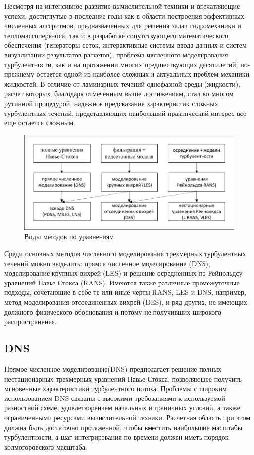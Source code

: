 	Несмотря на интенсивное развитие вычислительной техники и впечатляющие успехи, достигнутые в последние годы как в области построения эффективных численных алгоритмов, предназначенных для решения задач гидромеханики и тепломассопереноса, так и в разработке сопутствующего математического обеспечения (генераторы сеток, интерактивные системы ввода данных и систем визуализации результатов расчетов), проблема численного моделирования турбулентности, как и на протяжении многих предшествующих десятилетий, по-прежнему остается одной из наиболее сложных и актуальных проблем механики жидкостей. В отличие от ламинарных течений однофазной среды (жидкости), расчет которых, благодаря отмеченным выше достижениям, стал во многом рутинной процедурой, надежное предсказание характеристик сложных турбулентных течений, представляющих наибольший практический интерес все еще остается сложным.
	\begin{figure}[H]
		\centering
		\includegraphics[width=0.9\linewidth]{../Assets/СхемаМетодовRU}
		\caption{Виды методов по уравнениям}
		\label{fig:cheme}
	\end{figure}
	
	Среди основных методов численного моделирования трехмерных турбулентных течений можно выделить: прямое численное моделирование (DNS), моделирование крупных вихрей (LES) и решение осредненных по Рейнольдсу уравнений Навье-Стокса (RANS). Имеются также различные промежуточные подходы, сочетающие в себе те или иные черты RANS, LES и DNS, например, метод моделирования отсоединенных вихрей (DES), и ряд других, не имеющих должного физического обоснования и потому не получивших широкого распространения.

\subsection{DNS}
	
	Прямое численное моделирование(DNS) предполагает решение полных нестационарных трехмерных уравнений Навье-Стокса, позволяющее получить мгновенные характеристики турбулентного потока. Проблемы с широким использованием DNS связаны с высокими требованиями к используемой разностной схеме, удовлетворением начальных и граничных условий, а также ограниченными ресурсами вычислительной техники. Расчетная область при этом должна быть достаточно протяженной, чтобы вместить наибольшие масштабы турбулентности, а шаг интегрирования по времени должен иметь порядок колмогоровского масштаба.
	
